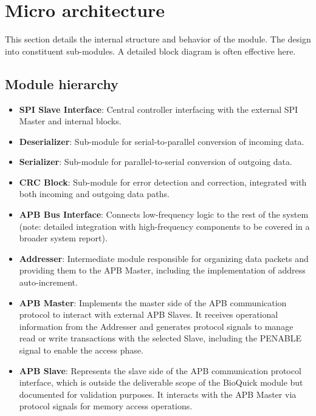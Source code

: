 \section{Micro architecture}

This section details the internal structure and behavior of the module. The design into constituent sub-modules. A detailed block diagram is often effective here.

\subsection{Module hierarchy}

\begin{itemize}[nosep]
    \item \textbf{SPI Slave Interface}: Central controller interfacing with the external SPI Master and internal blocks.
    \item \textbf{Deserializer}: Sub-module for serial-to-parallel conversion of incoming data.
    \item \textbf{Serializer}: Sub-module for parallel-to-serial conversion of outgoing data.
    \item \textbf{CRC Block}: Sub-module for error detection and correction, integrated with both incoming and outgoing data paths.
    \item \textbf{APB Bus Interface}: Connects low-frequency logic to the rest of the system (note: detailed integration with high-frequency components to be covered in a broader system report).
    \item \textbf{Addresser}: Intermediate module responsible for organizing data packets and providing them to the APB Master, including the implementation of address auto-increment.
    \item \textbf{APB Master}: Implements the master side of the APB communication protocol to interact with external APB Slaves. It receives operational information from the Addresser and generates protocol signals to manage read or write transactions with the selected Slave, including the PENABLE signal to enable the access phase.
    \item \textbf{APB Slave}: Represents the slave side of the APB communication protocol interface, which is outside the deliverable scope of the BioQuick module but documented for validation purposes. It interacts with the APB Master via protocol signals for memory access operations.
\end{itemize}

